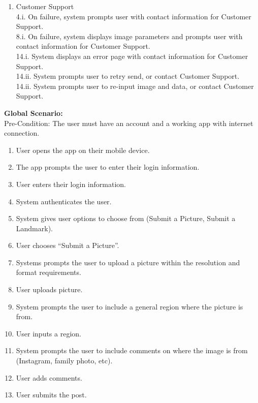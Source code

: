 \documentclass[]{article}
\begin{document}
\begin{enumerate}[{\bf BE1.}]
\begin{enumerate}[{\bf VP1.}]
			\item Customer Support \\
				4.i. On failure, system prompts user with contact          information for Customer Support. \\
                    8.i. On failure, system displays image parameters and prompts user with contact information for Customer Support. \\
                    14.i. System displays an error page with contact information for Customer Support. \\
	            14.ii. System prompts user to retry send, or contact       Customer Support. \\
	            14.ii. System prompts user to re-input image and data,     or contact Customer Support. \\
		\end{enumerate}
		{\bf Global Scenario:}\\
            Pre-Condition: The user must have an account and a working app with internet connection. 
		      \begin{enumerate}[{1.}]
                    \item User opens the app on their mobile device. 
                    \item The app prompts the user to enter their login information.
                    \item User enters their login information.
                    \item System authenticates the user. 
                    \item System gives user options to choose from (Submit a Picture, Submit a Landmark).  
                    \item User chooses “Submit a Picture”. 
                    \item Systems prompts the user to upload a picture within the resolution and format requirements.
                    \item User uploads picture.
                    \item System prompts the user to include a general region where the picture is from. 
                    \item User inputs a region. 
                    \item System prompts the user to include comments on where the image is from (Instagram, family photo, etc). 
                    \item User adds comments.
                    \item User submits the post.

\end{enumerate}
\end{enumerate}
\end{document}
